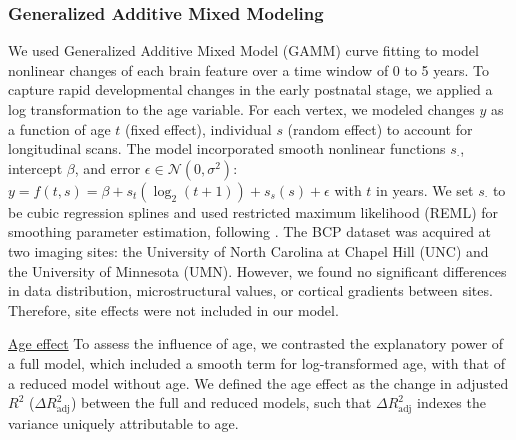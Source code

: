 \subsubsection{Generalized Additive Mixed Modeling}\label{subsec:GAMM}
We used Generalized Additive Mixed Model (GAMM) curve fitting to model nonlinear changes of each brain feature over a time window of 0 to 5 years. To capture rapid developmental changes in the early postnatal stage, we applied a log transformation to the age variable.
For each vertex, we modeled changes $y$ as a function of age $t$ (fixed effect), individual $s$ (random effect) to account for longitudinal scans. The model incorporated smooth nonlinear functions $s_{\cdot}$, intercept $\beta$, and error $\epsilon \in \mathcal{N}(0,\sigma^2)$: $y=f(t,s)=\beta + s_t(\log_2(t+1)) + s_s(s) + \epsilon$ with $t$ in years.
We set $s_{\cdot}$ to be cubic regression splines and used restricted maximum likelihood (REML) for smoothing parameter estimation, following \cite{taylorFunctionalHierarchyHuman2024}.
The BCP dataset was acquired at two imaging sites: the University of North Carolina at Chapel Hill (UNC) and the University of Minnesota (UMN). However, we found no significant differences in data distribution, microstructural values, or cortical gradients between sites. Therefore, site effects were not included in our model. 

\noindent\underline{Age effect}
To assess the influence of age, we contrasted the explanatory power of a full model, which included a smooth term for log-transformed age, with that of a reduced model without age. 
We defined the age effect as the change in adjusted $R^2$ ($\Delta R_{\text{adj}}^2$) between the full and reduced models, such that $\Delta R_{\text{adj}}^2$ indexes the variance uniquely attributable to age\cite{luoTwoAxesWhite2026}.
